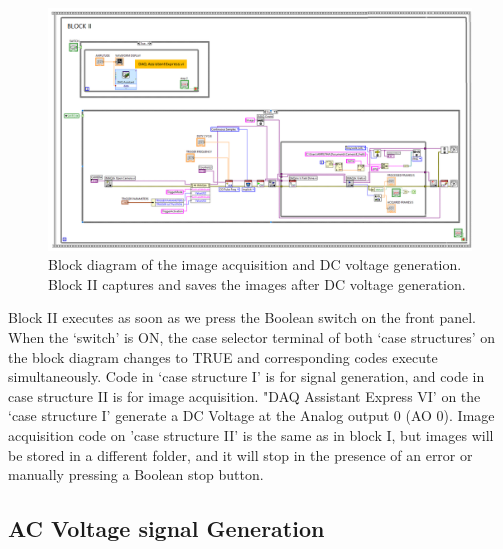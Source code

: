 \documentclass[journal=jacsat,manuscript=article]{achemso}
\begin{document}
\begin{figure}[H]
    \centering
    \includegraphics[width=1.3\linewidth,angle=90]{Block2.png}
    \caption{Block diagram of the image acquisition and DC voltage
      generation. Block II captures and saves the images after DC
      voltage generation.}
    \label{fig:ex5}
\end{figure}
Block II executes as soon as we press the Boolean switch on the front
panel. When the ‘switch’ is ON, the case selector terminal of both
‘case structures’ on the block diagram changes to TRUE and
corresponding codes execute simultaneously. Code in ‘case structure I’
is for signal generation, and code in case structure II is for image
acquisition. "DAQ Assistant Express VI' on the ‘case structure I’
generate a DC Voltage at the Analog output 0 (AO 0). Image acquisition
code on 'case structure II' is the same as in block I, but images will
be stored in a different folder, and it will stop in the presence of
an error or manually pressing a Boolean stop button.
\subsection{AC Voltage signal Generation}
\end{document}
